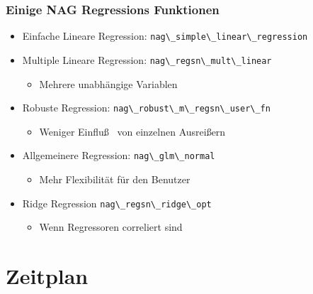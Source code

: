 \documentclass{beamer}
\begin{document}
\begin{frame}
 \frametitle{Einige NAG Regressions Funktionen}
 \begin{itemize}
  \item \alert<2>{Einfache Lineare Regression: \hfill \lstinline{nag\_simple\_linear\_regression}}	
  \item \alert<2>{Multiple Lineare Regression: \hfill \lstinline{nag\_regsn\_mult\_linear}}
    \begin{itemize}
     \item Mehrere unabh\"angige Variablen
    \end{itemize}
  \item \alert<2>{Robuste Regression: \hfill \lstinline{nag\_robust\_m\_regsn\_user\_fn}}
    \begin{itemize}
     \item Weniger Einflu\ss~ von einzelnen Ausrei\ss ern
    \end{itemize}
  \item Allgemeinere Regression: \hfill \lstinline{nag\_glm\_normal}
    \begin{itemize}
     \item Mehr Flexibilit\"at f\"ur den Benutzer
    \end{itemize}
  \item Ridge Regression \hfill \lstinline{nag\_regsn\_ridge\_opt}
    \begin{itemize}
      \item Wenn Regressoren correliert sind
    \end{itemize}

 \end{itemize}

\end{frame}


\section{Zeitplan}
\end{document}

